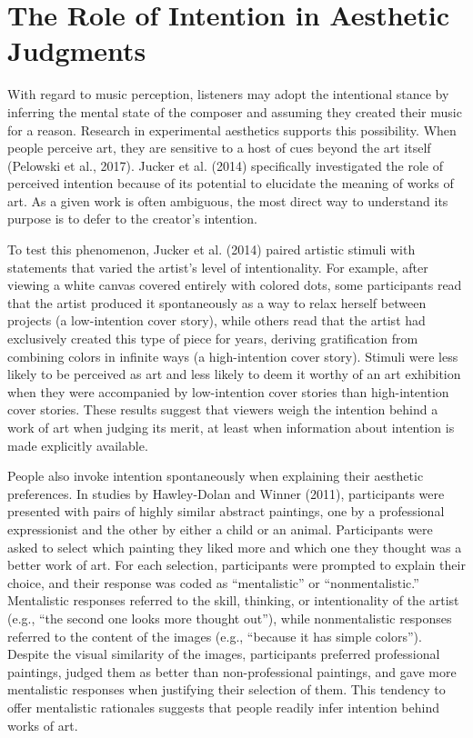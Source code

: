 \documentclass[12pt,twoside]{reedthesis}
\begin{document}
\section{The Role of Intention in Aesthetic Judgments
}
With regard to music perception, listeners may adopt the intentional stance by inferring the mental state of the composer and assuming they created their music for a reason. Research in experimental aesthetics supports this possibility. When people perceive art, they are sensitive to a host of cues beyond the art itself (Pelowski et al., 2017). Jucker et al. (2014) specifically investigated the role of perceived intention because of its potential to elucidate the meaning of works of art. As a given work is often ambiguous, the most direct way to understand its purpose is to defer to the creator’s intention. 

To test this phenomenon, Jucker et al. (2014) paired artistic stimuli with statements that varied the artist’s level of intentionality. For example, after viewing a white canvas covered entirely with colored dots, some participants read that the artist produced it spontaneously as a way to relax herself between projects (a low-intention cover story), while others read that the artist had exclusively created this type of piece for years, deriving gratification from combining colors in infinite ways (a high-intention cover story). Stimuli were less likely to be perceived as art and less likely to deem it worthy of an art exhibition when they were accompanied by low-intention cover stories than high-intention cover stories. These results suggest that viewers weigh the intention behind a work of art when judging its merit, at least when information about intention is made explicitly available. 

People also invoke intention spontaneously when explaining their aesthetic preferences. In studies by Hawley-Dolan and Winner (2011), participants were presented with pairs of highly similar abstract paintings, one by a professional expressionist and the other by either a child or an animal. Participants were asked to select which painting they liked more and which one they thought was a better work of art. For each selection, participants were prompted to explain their choice, and their response was coded as “mentalistic” or “nonmentalistic.” Mentalistic responses referred to the skill, thinking, or intentionality of the artist (e.g., “the second one looks more thought out”), while nonmentalistic responses referred to the content of the images (e.g., “because it has simple colors”). Despite the visual similarity of the images, participants preferred professional paintings, judged them as better than non-professional paintings, and gave more mentalistic responses when justifying their selection of them. This tendency to offer mentalistic rationales suggests that people readily infer intention behind works of art. 
\end{document}
